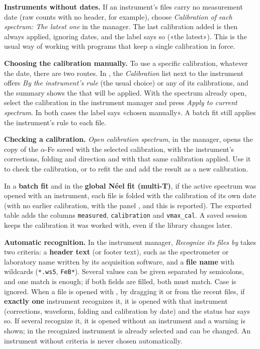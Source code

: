 \textbf{Instruments without dates.} If an instrument's files carry no measurement
date (raw counts with no header, for example), choose \emph{Calibration of each
spectrum: The latest one} in the manager. The last calibration added is then
always applied, ignoring dates, and the label says so («the latest»). This is the
usual way of working with programs that keep a single calibration in force.

\textbf{Choosing the calibration manually.} To use a specific calibration,
whatever the date, there are two routes. In , the
\emph{Calibration} list next to the instrument offers \emph{By the instrument's
rule} (the usual choice) or any of its calibrations, and the summary shows the
 that will be applied. With the spectrum already open, select the
calibration in the instrument manager and press \emph{Apply to current spectrum}.
In both cases the label says «chosen manually». A batch fit still applies the
instrument's rule to each file.

\textbf{Checking a calibration.} \emph{Open calibration spectrum}, in the manager,
opens the copy of the $\alpha$-Fe saved with the selected calibration, with the
instrument's corrections, folding and direction and with that same calibration
applied. Use it to check the calibration, or to refit the  and add
the result as a new calibration.

In a \textbf{batch fit} and in the \textbf{global Néel fit (multi-T)}, if the
active spectrum was opened with an instrument, each file is folded with the
calibration of its own date (with no earlier calibration, with the panel
, and this is reported). The exported table adds the columns \texttt{measured}, \texttt{calibration} and \texttt{vmax\_cal}.
A saved session keeps the calibration it was worked with, even if the library
changes later.

\textbf{Automatic recognition.} In the instrument manager, \emph{Recognize its
files by} takes two criteria: a \textbf{header text} (or footer text), such as
the spectrometer or laboratory name written by its acquisition software, and a
\textbf{file name} with wildcards (\texttt{*.ws5}, \texttt{FeB*}). Several values
can be given separated by semicolons, and one match is enough; if both fields are
filled, both must match. Case is ignored. When a file is opened with
, by dragging it or from the recent files, if \textbf{exactly one}
instrument recognizes it, it is opened with that instrument (corrections,
waveform, folding and calibration by date) and the status bar says so. If several
recognize it, it is opened without an instrument and a warning is shown; in
 the recognized instrument is already selected and can be changed.
An instrument without criteria is never chosen automatically.


